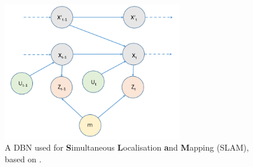 

\begin{figure}
    \includegraphics[width = 0.7\textwidth]{Chapters/BackgroundKnowledgeAndRelatedWork/MultiAgentTargetDetectionBackground/Figs/DBNs/Complex2TDBN.PNG}
    \caption{A DBN used for \textbf{S}imultaneous \textbf{L}ocalisation \textbf{a}nd \textbf{M}apping (SLAM), based on \cite[p.~311]{Thrun:2005:ProbabilisticRobotics}.}
    \label{fig:2TDBNExample}
\end{figure}

